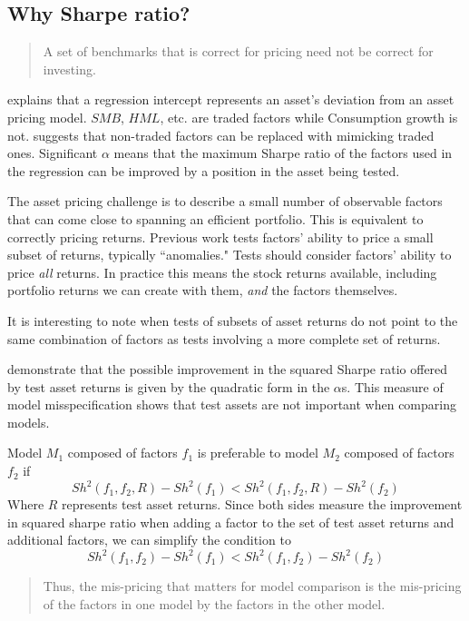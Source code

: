 
\subsection{Why Sharpe ratio? \cite{barillas2016alpha}}

\cite{pastor2000comparing}
\begin{quotation}
  A set of benchmarks that is correct for pricing need not be correct for 
  investing.
\end{quotation}


\cite{jensen1968performance} explains that a regression intercept represents 
an asset's deviation from an asset pricing model.
$SMB$, $HML$, etc. are traded factors while Consumption growth is not.
\cite{breeden2005intertemporal} suggests that non-traded factors can be 
replaced with mimicking traded ones.
Significant $\alpha$ means that the maximum Sharpe ratio of the factors used 
in the regression can be improved by a position in the asset being tested.

The asset pricing challenge is to describe a small number of observable 
factors that can come close to spanning an efficient portfolio. This is 
equivalent to correctly pricing returns.
Previous work tests factors' ability to price a small subset of returns, 
typically ``anomalies."
Tests should consider factors' ability to price \emph{all} returns.
In practice this means the stock returns available, including portfolio 
returns we can create with them, \emph{and} the factors themselves.

It is interesting to note when tests of subsets of asset returns do not point 
to the same combination of factors as tests involving a more complete set of 
returns.

\cite{gibbons1989test} demonstrate that the possible improvement in the 
squared Sharpe ratio offered by test asset returns is given by the quadratic 
form in the $\alpha$s.
This measure of model misspecification shows that test assets are not 
important when comparing models.

Model $M_1$ composed of factors $f_1$ is preferable to model $M_2$ composed of 
factors $f_2$ if
\[
Sh^2(f_1, f_2, R) - Sh^2(f_1) < Sh^2(f_1, f_2, R) - Sh^2(f_2)
\]
Where $R$ represents test asset returns.
Since both sides measure the improvement in squared sharpe ratio when adding a 
factor to the set of test asset returns and additional factors,
we can simplify the condition to
\[
Sh^2(f_1, f_2) - Sh^2(f_1) < Sh^2(f_1, f_2) - Sh^2(f_2)
\]
\begin{quotation}
  Thus, the mis-pricing that matters for model comparison is the mis-pricing 
  of the factors in one model by the factors in the other model.
\end{quotation}

